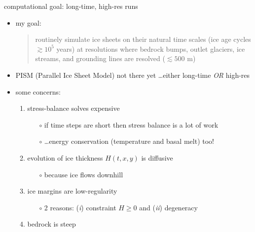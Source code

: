 \documentclass[hide notes,intlimits,usenames,dvipsnames]{beamer}
\begin{document}
\begin{frame}{computational goal: long-time, high-res runs}

\begin{itemize}
\item my goal:
\begin{quote}
routinely simulate ice sheets on their natural time scales (ice age cycles \alert{$\gtrsim 10^5$ years}) at resolutions where bedrock bumps, outlet glaciers, ice streams, and grounding lines are resolved (\alert{$\lesssim 500$ m})
\end{quote}

\medskip
\scriptsize
\item PISM (Parallel Ice Sheet Model) not there yet \dots either long-time \emph{OR} high-res

\medskip
\normalsize
\item some concerns:
    \begin{enumerate}
    \item stress-balance solves expensive
        \begin{itemize}
        \item[$\circ$] if time steps are short then stress balance is a lot of work
        \item[$\circ$] \dots energy conservation (temperature and basal melt) too!
        \end{itemize}
    \item evolution of ice thickness $H(t,x,y)$ is diffusive
        \begin{itemize}
        \item[$\circ$] because ice flows downhill
        \end{itemize}
    \item ice margins are low-regularity
        \begin{itemize}
        \item[$\circ$] 2 reasons: (\emph{i}) constraint $H\ge 0$ and (\emph{ii}) degeneracy
        \end{itemize}
    \item bedrock is steep
    \end{enumerate}
\end{itemize}
\end{frame}
\end{document}
